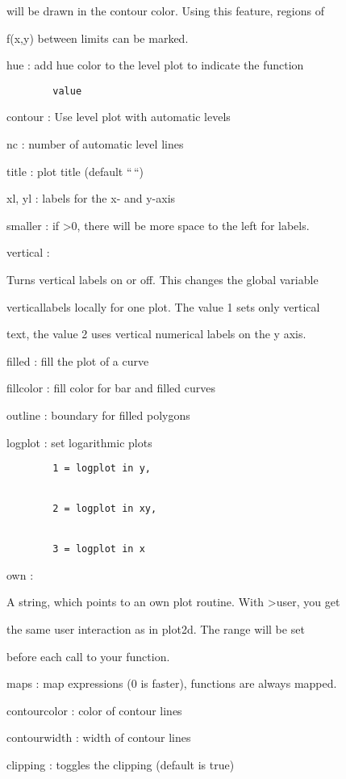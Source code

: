 \documentclass[
]{book}
\begin{document}
will be drawn in the contour color. Using this feature, regions of

f(x,y) between limits can be marked.

hue : add hue color to the level plot to indicate the function

\begin{verbatim}
        value
\end{verbatim}

contour : Use level plot with automatic levels

nc : number of automatic level lines

title : plot title (default ``\,``)

xl, yl : labels for the x- and y-axis

smaller : if \textgreater0, there will be more space to the left for labels.

vertical :

Turns vertical labels on or off. This changes the global variable

verticallabels locally for one plot. The value 1 sets only vertical

text, the value 2 uses vertical numerical labels on the y axis.

filled : fill the plot of a curve

fillcolor : fill color for bar and filled curves

outline : boundary for filled polygons

logplot : set logarithmic plots

\begin{verbatim}
        1 = logplot in y,


        2 = logplot in xy,


        3 = logplot in x
\end{verbatim}

own :

A string, which points to an own plot routine. With \textgreater user, you get

the same user interaction as in plot2d. The range will be set

before each call to your function.

maps : map expressions (0 is faster), functions are always mapped.

contourcolor : color of contour lines

contourwidth : width of contour lines

clipping : toggles the clipping (default is true)
\end{document}
